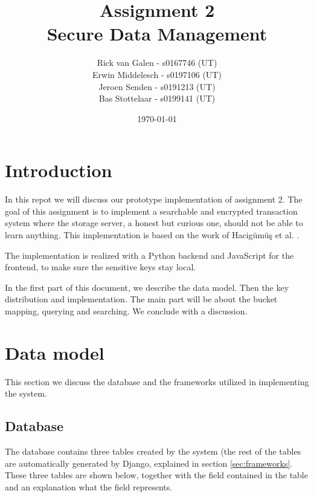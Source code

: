 \documentclass[a4paper]{article}
\begin{document}
\title{Assignment 2 \\ Secure Data Management}
\author{Rick van Galen - s0167746 (UT) \\ Erwin Middelesch - s0197106 (UT) \\ Jeroen Senden - s0191213 (UT) \\ Bas Stottelaar - s0199141 (UT)}
\date{\today}
\maketitle

\section{Introduction}
	In this repot we will discuss our prototype implementation of assignment 2. The goal of this assignment is to implement a searchable and encrypted transaction system where the storage server, a honest but curious one, should not be able to learn anything. This implementation is based on the work of Hacig{\"u}m{\"u}{\c{s}} et al. \cite{hacigumucs2002executing}.
	
	The implementation is realized with a Python backend and JavaScript for the frontend, to make sure the sensitive keys stay local.
	
	In the first part of this document, we describe the data model. Then the key distribution and implementation. The main part will be about the bucket mapping, querying and searching. We conclude with a discussion.

\section{Data model}
	This section we discuss the database and the frameworks utilized in implementing the system.
    
    \subsection{Database}
    	The database contains three tables created by the system (the rest of the tables are automatically generated by Django, explained in section \ref{sec:frameworks}. These three tables are shown below, together with the field contained in the table and an explanation what the field represents.
        
\end{document}
